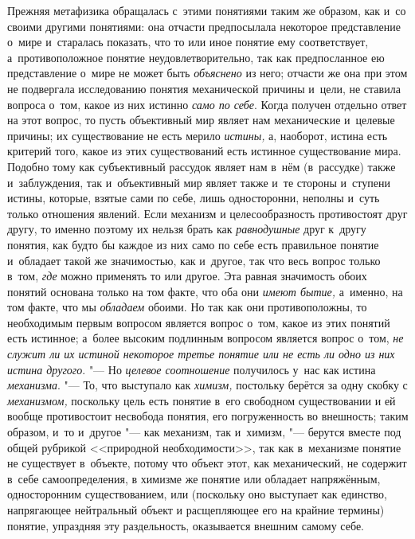 Прежняя метафизика обращалась с~этими понятиями таким же
образом, как и~со своими другими понятиями: она отчасти предпосылала
некоторое представление о~мире и~старалась показать, что то или иное
понятие ему соответствует, а~противоположное понятие неудовлетворительно,
так как предпосланное ею представление о~мире не может быть
{\em объяснено} из него;
отчасти же она при этом не подвергала исследованию понятия механической
причины и~цели, не ставила вопроса о~том, какое из них истинно
{\em само по себе}. Когда
получен отдельно ответ на этот вопрос, то пусть объективный мир являет нам
механические и~целевые причины; их существование не есть мерило
{\em истины,} а,
наоборот, истина есть критерий того, какое из этих существований есть
истинное существование мира. Подобно тому как субъективный рассудок являет
нам в~нём (в~рассудке) также и~заблуждения, так и~объективный мир являет
также и~те стороны и~ступени истины, которые, взятые сами по себе, лишь
односторонни, неполны и~суть только отношения явлений. Если механизм и
целесообразность противостоят друг другу, то именно поэтому их нельзя брать
как {\em равнодушные}
друг к~другу понятия, как будто бы каждое из них само по себе
есть правильное понятие и~обладает такой же значимостью, как и~другое, так
что весь вопрос только в~том, {\em где}
можно применять то или другое. Эта равная
значимость обоих понятий основана только на том факте, что
оба они {\em имеют бытие,}
а~именно, на том факте, что мы
{\em обладаем} обоими. Но
так как они противоположны, то необходимым первым вопросом является вопрос
о~том, какое из этих понятий есть истинное; а~более высоким подлинным
вопросом является вопрос о~том, {\em не
служит ли их истиной некоторое третье понятие или не есть ли одно из них
истина другого}. "--- Но
{\em целевое соотношение}
получилось у~нас как истина
{\em механизма}. "--- То,
что выступало как {\em химизм,}
постольку берётся за одну скобку с
{\em механизмом,}
поскольку цель есть понятие в~его свободном существовании и
ей вообще противостоит несвобода понятия, его погруженность во внешность;
таким образом, и~то и~другое "--- как механизм, так и~химизм,
"--- берутся вместе под общей рубрикой <<природной
необходимости>>, так как в~механизме понятие не существует в~объекте, потому
что объект этот, как механический, не содержит в~себе самоопределения, в
химизме же понятие или обладает напряжённым, односторонним существованием,
или (поскольку оно выступает как единство, напрягающее нейтральный объект и
расщепляющее его на крайние термины) понятие, упраздняя эту раздельность,
оказывается внешним самому себе.


